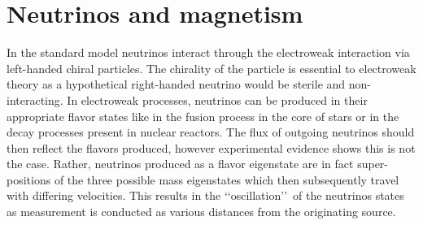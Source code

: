 \chapter{Neutrinos and magnetism}
\noindent In the standard model neutrinos interact through the electroweak interaction via left-handed chiral particles. The chirality of the particle is essential to electroweak theory as a hypothetical right-handed neutrino would be sterile and non-interacting. In electroweak processes, neutrinos can be produced in their appropriate flavor states like in the fusion process in the core of stars or in the decay processes present in nuclear reactors. The flux of outgoing neutrinos should then reflect the flavors produced, however experimental evidence shows this is not the case. Rather, neutrinos produced as a flavor eigenstate are in fact super-positions of the three possible mass eigenstates which then subsequently travel with differing velocities. This results in the \lq\lq oscillation\rq\rq\ of the neutrinos states as measurement is conducted as various distances from the originating source.

